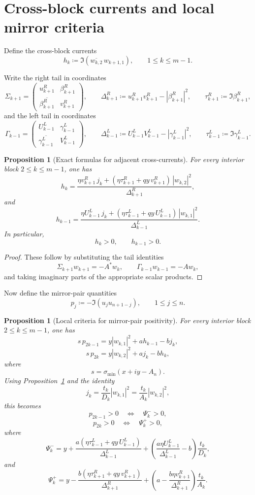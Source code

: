 \documentclass[11pt]{article}
\newtheorem{proposition}[theorem]{Proposition}
\begin{document}
\section{Cross-block currents and local mirror criteria}

Define the cross-block currents
\[
h_k\coloneqq \Im(\overline{w_{k,2}}\,w_{k+1,1}),
\qquad
1\le k\le m-1.
\]

Write the right tail in coordinates
\[
\Sigma_{k+1}=
\begin{pmatrix}
u_{k+1}^R & \beta_{k+1}^R\\
\overline{\beta_{k+1}^R} & v_{k+1}^R
\end{pmatrix},
\qquad
\Delta_{k+1}^R\coloneqq u_{k+1}^R v_{k+1}^R-|\beta_{k+1}^R|^2,
\qquad
\tau_{k+1}^R\coloneqq \Im \beta_{k+1}^R,
\]
and the left tail in coordinates
\[
\Gamma_{k-1}=
\begin{pmatrix}
U_{k-1}^L & \gamma_{k-1}^L\\
\overline{\gamma_{k-1}^L} & V_{k-1}^L
\end{pmatrix},
\qquad
\Delta_{k-1}^L\coloneqq U_{k-1}^L V_{k-1}^L-|\gamma_{k-1}^L|^2,
\qquad
\tau_{k-1}^L\coloneqq \Im \gamma_{k-1}^L.
\]

\begin{proposition}[Exact formulas for adjacent cross-currents]\label{prop:h}
For every interior block \(2\le k\le m-1\), one has
\[
h_k
=
\frac{
\eta v_{k+1}^R\,j_k
+
(\eta\tau_{k+1}^R+qy\,v_{k+1}^R)\,|w_{k,2}|^2
}{
\Delta_{k+1}^R
},
\]
and
\[
h_{k-1}
=
\frac{
\eta U_{k-1}^L\,j_k
+
(\eta\tau_{k-1}^L+qy\,U_{k-1}^L)\,|w_{k,1}|^2
}{
\Delta_{k-1}^L
}.
\]
In particular,
\[
h_k>0,
\qquad
h_{k-1}>0.
\]
\end{proposition}

\begin{proof}
These follow by substituting the tail identities
\[
\Sigma_{k+1}w_{k+1}=-A^*w_k,
\qquad
\Gamma_{k-1}w_{k-1}=-Aw_k,
\]
and taking imaginary parts of the appropriate scalar products.
\end{proof}

Now define the mirror-pair quantities
\[
p_j\coloneqq -\Im(u_j u_{n+1-j}),
\qquad 1\le j\le n.
\]

\begin{proposition}[Local criteria for mirror-pair positivity]\label{prop:Psi}
For every interior block \(2\le k\le m-1\), one has
\[
s\,p_{2k-1}
=
y|w_{k,1}|^2+a h_{k-1}-b j_k,
\]
\[
s\,p_{2k}
=
y|w_{k,2}|^2+a j_k-b h_k,
\]
where
\[
s=\sigma_{\min}(x+iy-A_n).
\]
Using Proposition~\ref{prop:h} and the identity
\[
j_k=\frac{t_k}{D_k}|w_{k,1}|^2=\frac{t_k}{A_k}|w_{k,2}|^2,
\]
this becomes
\[
p_{2k-1}>0
\quad\Longleftrightarrow\quad
\Psi_k^- >0,
\]
\[
p_{2k}>0
\quad\Longleftrightarrow\quad
\Psi_k^+ >0,
\]
where
\[
\Psi_k^-
=
y
+
\frac{a(\eta\tau_{k-1}^L+qy\,U_{k-1}^L)}{\Delta_{k-1}^L}
+
\left(
\frac{a\eta U_{k-1}^L}{\Delta_{k-1}^L}-b
\right)\frac{t_k}{D_k},
\]
and
\[
\Psi_k^+
=
y
-
\frac{b(\eta\tau_{k+1}^R+qy\,v_{k+1}^R)}{\Delta_{k+1}^R}
+
\left(
a-\frac{b\eta v_{k+1}^R}{\Delta_{k+1}^R}
\right)\frac{t_k}{A_k}.
\]
\end{proposition}
\end{document}
